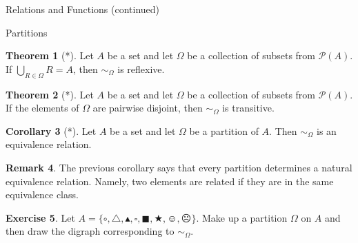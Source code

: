 \documentclass[11pt]{article}
\theoremstyle{definition}
\newtheorem{theorem}{Theorem}[section]
\newtheorem{corollary}[theorem]{Corollary}
\newtheorem{exercise}[theorem]{Exercise}
\newtheorem{remark}[theorem]{Remark}
\begin{document}
\begin{section}{Relations and Functions (continued)}
\begin{subsection}{Partitions}
\begin{theorem}[*]
Let $A$ be a set and let $\Omega$ be a collection of subsets from $\mathcal{P}(A)$.  If $\displaystyle \bigcup_{R\in\Omega}R=A$, then $\sim_{\Omega}$ is reflexive.
\end{theorem}

\begin{theorem}[*]
Let $A$ be a set and let $\Omega$ be a collection of subsets from $\mathcal{P}(A)$.  If the elements of $\Omega$ are pairwise disjoint, then $\sim_{\Omega}$ is transitive.
\end{theorem}

\begin{corollary}[*]
Let $A$ be a set and let $\Omega$ be a partition of $A$.  Then $\sim_{\Omega}$ is an equivalence relation.
\end{corollary}

\begin{remark}
The previous corollary says that every partition determines a natural equivalence relation.  Namely, two elements are related if they are in the same equivalence class.
\end{remark}

\begin{exercise}
Let $A=\{\circ, \triangle, \blacktriangle, \square, \blacksquare, \bigstar, \smiley, \frownie\}$.  Make up a partition $\Omega$ on $A$ and then draw the digraph corresponding to $\sim_{\Omega}$.
\end{exercise}

\end{subsection}

\end{section}
\end{document}
